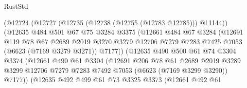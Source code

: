 \begin{lexlean}{RustStd}
\begin{coremodule}
                          (@12724
                            (@12727 (@12735 (@12738 (@12755 (@12783 @12785))) @11144))
                            (@12635
                              @484
                              @501
                              @67
                              @75
                              @3284
                              @3375
                              (@12661
                                @484
                                @67
                                @3284
                                (@12691
                                  @119
                                  @78
                                  @67
                                  @2689
                                  @2019
                                  @3270
                                  @3279
                                  @12706
                                  @7279
                                  @7283
                                  @7425
                                  @7053
                                  (@6623 (@7169 @3279 @3271))
                                  @7177))
                              (@12635
                                @490
                                @500
                                @61
                                @74
                                @3304
                                @3374
                                (@12661
                                  @490
                                  @61
                                  @3304
                                  (@12691
                                    @206
                                    @78
                                    @61
                                    @2689
                                    @2019
                                    @3289
                                    @3299
                                    @12706
                                    @7279
                                    @7283
                                    @7492
                                    @7053
                                    (@6623 (@7169 @3299 @3290))
                                    @7177))
                                (@12635
                                  @492
                                  @499
                                  @61
                                  @73
                                  @3325
                                  @3373
                                  (@12661
                                    @492
                                    @61

\end{coremodule}
\end{lexlean}
